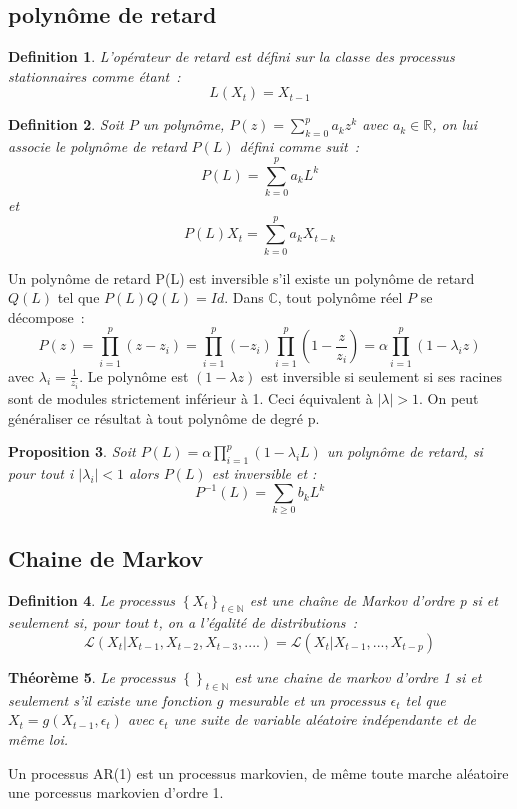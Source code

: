 \documentclass[11pt]{scrartcl} %
\newtheorem{theorem}{Théorème}[section]
\newtheorem{Def}[theorem]{Definition}
\newtheorem{pro}[theorem]{Proposition}
\begin{document}
\subsection{polynôme de retard}
\begin{Def}
L'opérateur de retard est défini sur la classe des processus stationnaires comme étant~: 
$$
L(X_t)=X_{t-1}
$$
\end{Def}
\begin{Def}
Soit $P$ un polynôme, $P(z)=\sum_{k=0}^{p}a_kz^k$ avec $a_k\in\mathbb{R}$, on lui associe le polynôme de retard $P(L)$ défini comme suit~:
$$
P(L)=\sum_{k=0}^pa_kL^k
$$
et 
$$
P(L)X_t=\sum_{k=0}^pa_kX_{t-k}
$$
\end{Def}
Un polynôme de retard P(L) est inversible s'il existe un polynôme de retard $Q(L)$ tel que $P(L)Q(L)=Id$. Dans $\mathbb{C}$, tout polynôme réel $P$ se décompose~:
$$
P(z)=\prod_{i=1}^p(z-z_i)=\prod_{i=1}^p(-z_i)\prod_{i=1}^p(1-\frac{z}{z_i})=\alpha\prod_{i=1}^p(1-\lambda_i z)
$$
avec $\lambda_i=\frac{1}{z_i}$.
Le polynôme est $(1-\lambda z)$ est inversible si seulement si ses racines sont de modules strictement inférieur à 1. Ceci équivalent à $|\lambda|>1$. On peut généraliser ce résultat à tout polynôme de degré p.
\begin{pro}
Soit $P(L) = \alpha\prod_{i=1}^p(1-\lambda_i L)$ un polynôme de retard, si pour tout i $|\lambda_i|<1$ alors $P(L)$ est inversible et :
$$
P^{-1}(L)= \sum_{k\geq 0}b_kL^k
$$
\end{pro}

\subsection{Chaine de Markov}
\begin{Def}
Le processus $\left\{X_t\right\}_{t\in\mathbb{N}}$ est une chaîne de Markov d'ordre p si et seulement si, pour tout $t$, on a l'égalité de distributions~:
$$
\mathcal{L}\left(X_t|X_{t-1},X_{t-2},X_{t-3},....\right) = \mathcal{L}\left(X_t|X_{t-1},...,X_{t-p}\right)
$$
\end{Def}
\begin{theorem}
Le processus $\left\{\right\}_{t\in\mathbb{N}}$ est une chaine de markov d'ordre 1 si et seulement s'il existe une fonction $g$ mesurable et un processus $\epsilon_t$ tel que $X_t=g(X_{t-1},\epsilon_t)$ avec $\epsilon_t$ une suite de variable aléatoire indépendante et de même loi.
\end{theorem}
Un processus AR(1) est un processus markovien, de même toute marche aléatoire une porcessus markovien d'ordre 1.



\end{document}
